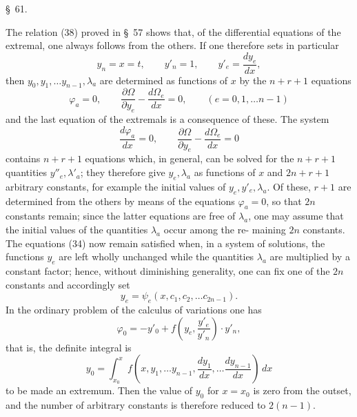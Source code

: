 \documentclass[11pt,a4paper,leqno]{article}
\begin{document}


\begin{center}
{\large \S~61.}
\end{center}

The relation (38) proved in \S~57 shows that, of the
differential equations of the extremal, one always follows from the others.
If one therefore sets in particular
\[
y_n=x=t,\qquad y'_n=1,\qquad y'_e=\frac{dy_e}{dx},
\]
then $y_0,y_1,\ldots y_{n-1},\lambda_a$ are determined as functions of $x$ by the
$n+r+1$ equations
\begin{equation}\tag{68}
\varphi_a=0,\qquad
\frac{\partial\Omega}{\partial y_e}-\frac{d\Omega_e}{dx}=0,
\qquad(e=0,1,\ldots n-1)
\end{equation}
and the last equation of the extremals is a consequence
of these. The system
\[
\frac{d\varphi_a}{dx}=0,\qquad
\frac{\partial\Omega}{\partial y_e}-\frac{d\Omega_e}{dx}=0
\]
contains $n+r+1$ equations which, in general, can be solved for
the $n+r+1$ quantities $y''_e,\lambda'_a$; they therefore give
$y_e,\lambda_a$ as functions of $x$ and $2n+r+1$ arbitrary
constants, for example the initial values of $y_e,y'_e,\lambda_a$.
Of these, $r+1$ are determined from the others by means of
the equations $\varphi_a=0$, so that $2n$ constants remain;
since the latter equations are free of $\lambda_a$, one may assume
that the initial values of the quantities $\lambda_a$ occur among the re-
maining $2n$ constants. The equations (34) now remain satisfied
when, in a system of solutions, the functions $y_e$ are left wholly
unchanged while the quantities $\lambda_a$ are multiplied by a constant
factor; hence, without diminishing generality, one can fix one
of the $2n$ constants and accordingly set
\begin{equation}\tag{69}
y_e=\psi_e(x,c_1,c_2,\ldots c_{2n-1}).
\end{equation}
In the ordinary problem of the calculus of variations one has
\[
\varphi_0=-y'_0+f\left(y_e,\frac{y'_e}{y'_n}\right)\cdot y'_n,
\]
that is, the definite integral is
\[
y_0=\int_{x_0}^{x}
f\left(x,y_1,\ldots y_{n-1},\frac{dy_1}{dx},\ldots\frac{dy_{n-1}}{dx}\right)\,dx
\]
to be made an extremum. Then the value of $y_0$ for
$x=x_0$ is zero from the outset, and the number
of arbitrary constants is therefore reduced to $2(n-1)$.
\end{document}
